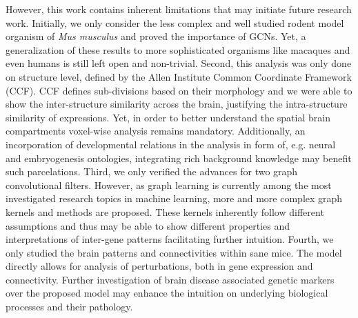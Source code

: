 \documentclass[]{article}
\begin{document}
However, this work contains inherent limitations that may initiate future research work. Initially, we only consider the less complex and well studied rodent model organism of \textit{Mus musculus} and proved the importance of GCNs. Yet, a generalization of these results to more sophisticated organisms like macaques and even humans is still left open and non-trivial. Second, this analysis was only done on structure level, defined by the Allen Institute Common Coordinate Framework (CCF). CCF defines sub-divisions based on their morphology and we were able to show the inter-structure similarity across the brain, justifying the intra-structure similarity of expressions. Yet, in order to better understand the spatial brain compartments voxel-wise analysis remains mandatory. Additionally, an incorporation of developmental relations in the analysis in form of, e.g. neural and embryogenesis ontologies, integrating rich background knowledge may benefit such parcelations.
Third, we only verified the advances for two graph convolutional filters. However, as graph learning is currently among the most investigated research topics in machine learning, more and more complex graph kernels and methods are proposed. These kernels inherently follow different assumptions and thus may be able to show different properties and interpretations of inter-gene patterns facilitating further intuition. 
Fourth, we only studied the brain patterns and connectivities within sane mice. The model directly allows for analysis of perturbations, both in gene expression and connectivity. Further investigation of brain disease associated genetic markers over the proposed model may enhance the intuition on underlying biological processes and their pathology.
\end{document}
